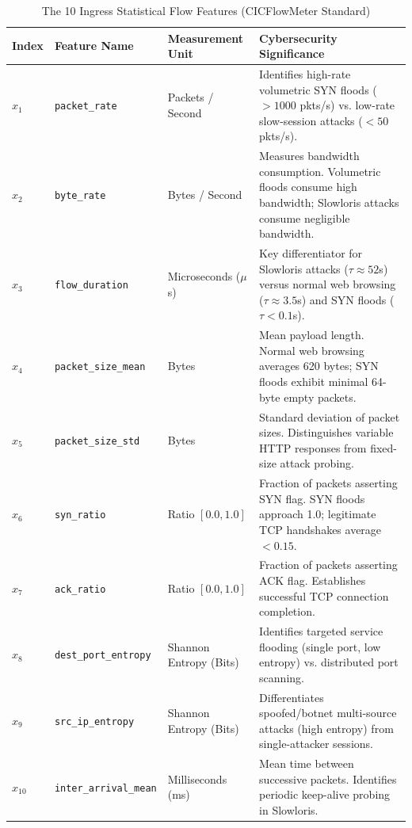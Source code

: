\documentclass[12pt,a4paper,oneside]{report}
\begin{document}
\begin{table}[H]
\caption{The 10 Ingress Statistical Flow Features (CICFlowMeter Standard)}
\centering
\small
\begin{tabularx}{\textwidth}{l l p{3.2cm} p{6.8cm}}
\toprule
\textbf{Index} & \textbf{Feature Name} & \textbf{Measurement Unit} & \textbf{Cybersecurity Significance} \\
\midrule
$x_1$ & \texttt{packet\_rate} & Packets / Second & Identifies high-rate volumetric SYN floods ($> 1000$ pkts/s) vs. low-rate slow-session attacks ($< 50$ pkts/s). \\
\addlinespace
$x_2$ & \texttt{byte\_rate} & Bytes / Second & Measures bandwidth consumption. Volumetric floods consume high bandwidth; Slowloris attacks consume negligible bandwidth. \\
\addlinespace
$x_3$ & \texttt{flow\_duration} & Microseconds ($\mu$s) & Key differentiator for Slowloris attacks ($\tau \approx 52$s) versus normal web browsing ($\tau \approx 3.5$s) and SYN floods ($\tau < 0.1$s). \\
\addlinespace
$x_4$ & \texttt{packet\_size\_mean} & Bytes & Mean payload length. Normal web browsing averages 620 bytes; SYN floods exhibit minimal 64-byte empty packets. \\
\addlinespace
$x_5$ & \texttt{packet\_size\_std} & Bytes & Standard deviation of packet sizes. Distinguishes variable HTTP responses from fixed-size attack probing. \\
\addlinespace
$x_6$ & \texttt{syn\_ratio} & Ratio $[0.0, 1.0]$ & Fraction of packets asserting SYN flag. SYN floods approach 1.0; legitimate TCP handshakes average $< 0.15$. \\
\addlinespace
$x_7$ & \texttt{ack\_ratio} & Ratio $[0.0, 1.0]$ & Fraction of packets asserting ACK flag. Establishes successful TCP connection completion. \\
\addlinespace
$x_8$ & \texttt{dest\_port\_entropy} & Shannon Entropy (Bits) & Identifies targeted service flooding (single port, low entropy) vs. distributed port scanning. \\
\addlinespace
$x_9$ & \texttt{src\_ip\_entropy} & Shannon Entropy (Bits) & Differentiates spoofed/botnet multi-source attacks (high entropy) from single-attacker sessions. \\
\addlinespace
$x_{10}$ & \texttt{inter\_arrival\_mean} & Milliseconds (ms) & Mean time between successive packets. Identifies periodic keep-alive probing in Slowloris. \\
\bottomrule
\end{tabularx}
\label{tab:feature_schema}
\end{table}
\end{document}
